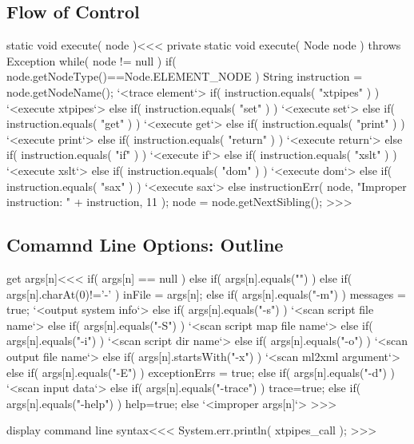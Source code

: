 \documentclass{article}
\begin{document}
{%
\subsection{Flow of Control}


\<static void execute( node )\><<<
private static void execute( Node node ) throws Exception {
  while( node != null ){ 
    if( node.getNodeType()==Node.ELEMENT_NODE ){
      String instruction = node.getNodeName();
      `<trace element`>
      if( instruction.equals( "xtpipes" ) ){
         `<execute xtpipes`>
      } else if( instruction.equals( "set" ) ){
         `<execute set`>
      } else if( instruction.equals( "get" ) ){
         `<execute get`>
      } else if( instruction.equals( "print" ) ){
         `<execute print`>
      } else if( instruction.equals( "return" ) ){
         `<execute return`>
      } else if( instruction.equals( "if" ) ){
         `<execute if`>
      } else if( instruction.equals( "xslt" ) ){
         `<execute xslt`>
      } else if( instruction.equals( "dom" ) ){
         `<execute dom`>
      } else if( instruction.equals( "sax" ) ){
         `<execute sax`>
      } else {
         instructionErr( node, "Improper instruction: " + instruction, 11 );     
    } }
    node = node.getNextSibling();
} }
>>>



\subsection{Comamnd Line Options: Outline}



\<get args[n]\><<<
if( args[n] == null ){}
else if( args[n].equals("") ){}
else if( args[n].charAt(0)!='-' ){ inFile = args[n]; }
else if( args[n].equals("-m") ){ 
  messages = true;
  `<output system info`>
}
else if( args[n].equals("-s") ){ 
  `<scan script file name`>
}
else if( args[n].equals("-S") ){ 
  `<scan script map file name`>
}
else if( args[n].equals("-i") ){ 
  `<scan script dir name`>
}
else if( args[n].equals("-o") ){ 
  `<scan output file name`>
}
else if( args[n].startsWith("-x") ){ 
  `<scan ml2xml argument`>
}
else if( args[n].equals("-E") ){ 
  exceptionErrs = true;
}
else if( args[n].equals("-d") ){ 
  `<scan input data`>
}
else if( args[n].equals("-trace") ){ trace=true; }
else if( args[n].equals("-help") ){ help=true; }
else { `<improper args[n]`> }
>>>


\<display command line syntax\><<<
System.err.println( xtpipes_call );
>>>

}
\end{document}

